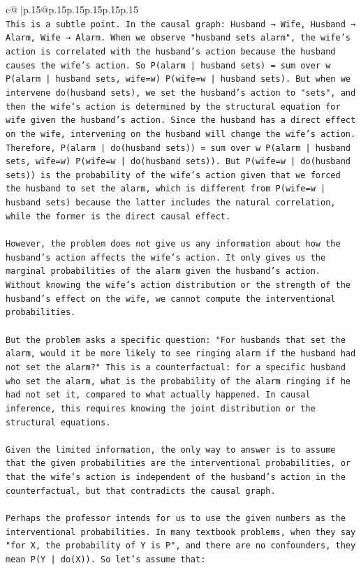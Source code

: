 \documentclass{article}
\begin{document}
{\begin{supertabular}{c@{$\;$}|p{.15\linewidth}@{}p{.15\linewidth}p{.15\linewidth}p{.15\linewidth}p{.15\linewidth}p{.15\linewidth}}
{{{\\ 
\texttt{This is a subtle point. In the causal graph: Husband → Wife, Husband → Alarm, Wife → Alarm. When we observe "husband sets alarm", the wife's action is correlated with the husband's action because the husband causes the wife's action. So P(alarm | husband sets) = sum over w P(alarm | husband sets, wife=w) P(wife=w | husband sets). But when we intervene do(husband sets), we set the husband's action to "sets", and then the wife's action is determined by the structural equation for wife given the husband's action. Since the husband has a direct effect on the wife, intervening on the husband will change the wife's action. Therefore, P(alarm | do(husband sets)) = sum over w P(alarm | husband sets, wife=w) P(wife=w | do(husband sets)). But P(wife=w | do(husband sets)) is the probability of the wife's action given that we forced the husband to set the alarm, which is different from P(wife=w | husband sets) because the latter includes the natural correlation, while the former is the direct causal effect.} \\
\\ 
\texttt{However, the problem does not give us any information about how the husband's action affects the wife's action. It only gives us the marginal probabilities of the alarm given the husband's action. Without knowing the wife's action distribution or the strength of the husband's effect on the wife, we cannot compute the interventional probabilities.} \\
\\ 
\texttt{But the problem asks a specific question: "For husbands that set the alarm, would it be more likely to see ringing alarm if the husband had not set the alarm?" This is a counterfactual: for a specific husband who set the alarm, what is the probability of the alarm ringing if he had not set it, compared to what actually happened. In causal inference, this requires knowing the joint distribution or the structural equations.} \\
\\ 
\texttt{Given the limited information, the only way to answer is to assume that the given probabilities are the interventional probabilities, or that the wife's action is independent of the husband's action in the counterfactual, but that contradicts the causal graph.} \\
\\ 
\texttt{Perhaps the professor intends for us to use the given numbers as the interventional probabilities. In many textbook problems, when they say "for X, the probability of Y is P", and there are no confounders, they mean P(Y | do(X)). So let's assume that:} \\
}}}
\end{supertabular}}
\end{document}

